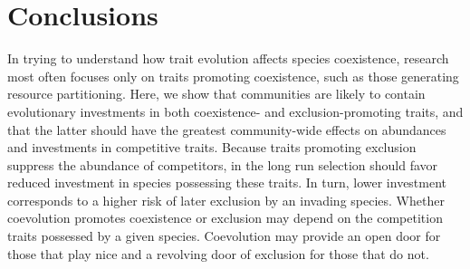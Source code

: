 
\section*{Conclusions}

In trying to understand how trait evolution affects species
coexistence, research most often focuses
only on traits promoting coexistence, such as those
generating resource partitioning. Here, we show that communities are
likely to contain evolutionary investments in both coexistence- and
exclusion-promoting traits, and that the latter should have the greatest
community-wide effects on abundances and investments in competitive
traits. Because traits promoting exclusion suppress the abundance of
competitors, in the long run selection should favor reduced investment
in species possessing these traits. In turn, lower investment
corresponds to a higher risk of later exclusion by an invading species.
Whether coevolution promotes coexistence or exclusion may depend on the
competition traits possessed by a given species. Coevolution may provide
an open door for those that play nice and a revolving door of exclusion
for those that do not.



